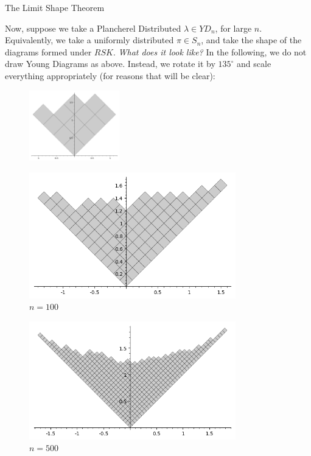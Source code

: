 \documentclass[aspectratio=169]{beamer}
\newcommand{\act}[1]{%
    \begin{frame}
    \centering
    \Huge

    {\color{purple} #1}
    \end{frame}
}
\begin{document}
\act{The Limit Shape Theorem}

\begin{frame}
Now, suppose we take a Plancherel Distributed $\lambda \in YD_n$, for large $n$. Equivalently, we take a uniformly distributed $\pi \in S_n$, and take the shape of the 
diagrams formed under $RSK$. \emph{What does it look like?} \vskip 10pt \pause
In the following, we do not draw Young Diagrams as above.
Instead, we rotate it by $135^{\circ}$ and scale everything appropriately (for reasons that will be clear):

\begin{figure}
    \centering
    \includegraphics[width=0.35\textwidth]{simpyd}
\end{figure}

\end{frame}

\begin{frame}\begin{figure}
    \centering
    \includegraphics[width = 0.8\textwidth]{pic100}
    \caption{$n = 100$}
\end{figure}
\end{frame}

\begin{frame}
\begin{figure}
    \centering
    \centering
    \includegraphics[width = 0.8\textwidth]{pic500}
\caption{$n = 500$}\end{figure}
\end{frame}
\end{document}
